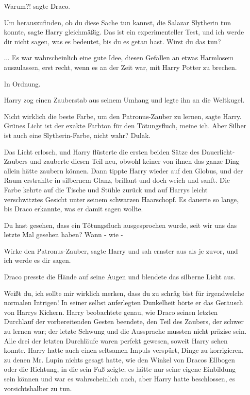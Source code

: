 \glqq{}Warum?!\grqq{} sagte Draco.

\glqq{}Um herauszufinden, ob du diese Sache tun kannst, die Salazar Slytherin tun
konnte\grqq{}, sagte Harry gleichmäßig. \glqq{}Das ist ein experimenteller Test,
und ich werde dir nicht sagen, was es bedeutet, bis du es getan hast. Wirst du
das tun?\grqq{}

... Es war wahrscheinlich eine gute Idee, diesen Gefallen an etwas Harmlosem
auszulassen, erst recht, wenn es an der Zeit war, mit Harry Potter zu brechen.

\glqq{}In Ordnung.\grqq{}

Harry zog einen Zauberstab aus seinem Umhang und legte ihn an die Weltkugel.

\glqq{}Nicht wirklich die beste Farbe, um den Patronus-Zauber zu lernen\grqq{},
sagte Harry. \glqq{}Grünes Licht ist der exakte Farbton für den Tötungsfluch,
meine ich. Aber Silber ist auch eine Slytherin-Farbe, nicht wahr? Dulak.\grqq{}

Das Licht erlosch, und Harry flüsterte die ersten beiden Sätze des
Dauerlicht-Zaubers und zauberte diesen Teil neu, obwohl keiner von ihnen das
ganze Ding allein hätte zaubern können. Dann tippte Harry wieder auf den Globus,
und der Raum erstrahlte in silbernem Glanz, brillant und doch weich und sanft.
Die Farbe kehrte auf die Tische und Stühle zurück und auf Harrys leicht
verschwitztes Gesicht unter seinem schwarzen Haarschopf. Es dauerte so lange,
bis Draco erkannte, was er damit sagen wollte.

\glqq{}Du hast gesehen, dass ein Tötungsfluch ausgesprochen wurde, seit wir uns
das letzte Mal gesehen haben? Wann - wie -\grqq{}

\glqq{}Wirke den Patronus-Zauber\grqq{}, sagte Harry und sah ernster aus als je
zuvor, \glqq{}und ich werde es dir sagen.\grqq{}

Draco presste die Hände auf seine Augen und blendete das silberne Licht aus.

\glqq{}Weißt du, ich sollte mir wirklich merken, dass du zu schräg bist für
irgendwelche normalen Intrigen!\grqq{} In seiner selbst auferlegten Dunkelheit
hörte er das Geräusch von Harrys Kichern. Harry beobachtete genau, wie Draco
seinen letzten Durchlauf der vorbereitenden Gesten beendete, den Teil des
Zaubers, der schwer zu lernen war; der letzte Schwung und die Aussprache mussten
nicht präzise sein. Alle drei der letzten Durchläufe waren perfekt gewesen,
soweit Harry sehen konnte. Harry hatte auch einen seltsamen Impuls verspürt,
Dinge zu korrigieren, zu denen Mr. Lupin nichts gesagt hatte, wie den Winkel von
Dracos Ellbogen oder die Richtung, in die sein Fuß zeigte; es hätte nur seine
eigene Einbildung sein können und war es wahrscheinlich auch, aber Harry hatte
beschlossen, es vorsichtshalber zu tun.

